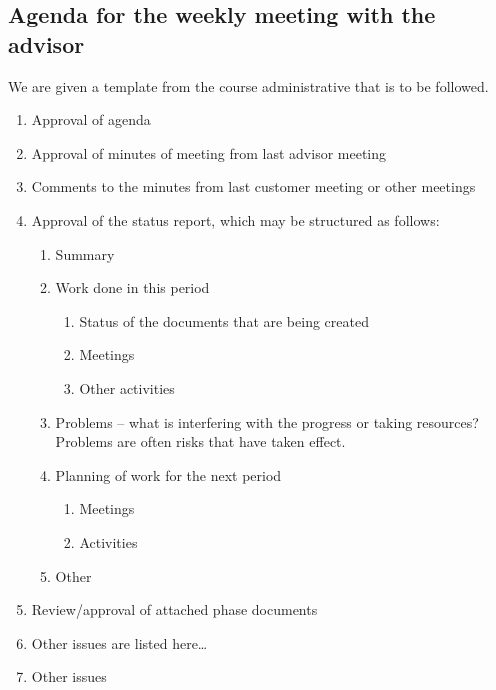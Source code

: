 \subsection{Agenda for the weekly meeting with the advisor}
We are given a template from the course administrative that is to be followed.
\newline
\newline
\begin{enumerate}
\item{}Approval of agenda
\item{}Approval of minutes of meeting from last advisor meeting
\item{}Comments to the minutes from last customer meeting or other meetings
\item{}Approval of the status report, which may be structured as follows:
\begin{enumerate}
\item{}Summary
\item{}Work done in this period
\begin{enumerate}
\item{}Status of the documents that are being created
\item{}Meetings
\item{}Other activities
\end{enumerate}
\item{}Problems – what is interfering with the progress or taking resources? Problems are often risks that have taken effect.
\item{}Planning of work for the next period
\begin{enumerate}
\item{}Meetings
\item{}Activities
\end{enumerate}
\item{}Other
\end{enumerate}
\item{}Review/approval of attached phase documents
\item{}Other issues are listed here…
\item{}Other issues
\end{enumerate}

